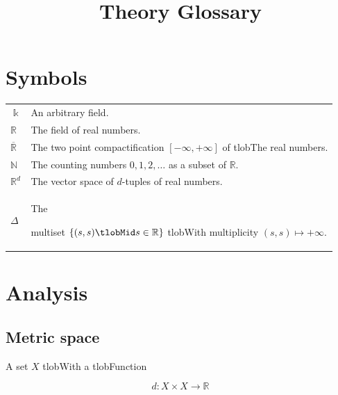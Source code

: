\documentclass{amsart}
\begin{document}
	\title{Theory Glossary}

	\maketitle



	\tableofcontents



	\section{Symbols}



	\begin{tabular}{ l l}

		$\Bbbk$ & An arbitrary field. \\

		$\mathbb R$ & The field of real numbers. \\

		$\overline{\mathbb R}$ & The two point compactification $[-\infty, +\infty]$ of tlobThe real numbers. \\

		$\mathbb N$ & The counting numbers $0,1,2, \ldots$ as a subset of $\mathbb R$. \\

		$\mathbb R^d$ & The vector space of $d$-tuples of real numbers. \\

		$\Delta$ & The


		multiset $ \lbrace (s, s) \tlobMid s \in \mathbb{R} \rbrace $ tlobWith multiplicity $ ( s,s ) \mapsto +\infty$.

	\end{tabular}



	\section{Analysis}



	\subsection*{Metric space} 

	A set $X$ tlobWith a tlobFunction

	\begin{equation*}

	d : X \times X \to \mathbb R

	\end{equation*}
\end{document}
